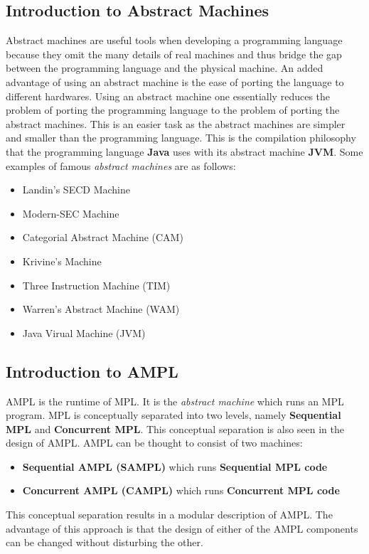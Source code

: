 \documentclass[11pt]{article}
\newcommand{\<}{\langle}
\renewcommand{\>}{\rangle}
\begin{document}
\subsection {Introduction to Abstract Machines}
Abstract machines are useful tools when developing a programming language because they omit the many details of real machines and thus bridge the gap between the programming language and the physical machine. An added advantage of using an abstract machine is the ease of porting the language to different hardwares. Using an abstract machine one essentially reduces the problem of porting the programming language to the problem of porting the abstract machines. This is an easier task as the abstract machines are simpler and smaller than the programming language. This is the compilation philosophy that the programming language {\bf Java} uses with its abstract machine {\bf JVM}. Some examples of famous {\em abstract machines} are as follows:
\begin{itemize} 
  \item Landin's SECD Machine
  \item Modern-SEC Machine
  \item Categorial Abstract Machine (CAM)
  \item Krivine's Machine
  \item Three Instruction Machine (TIM)
  \item Warren's Abstract Machine (WAM)
  \item Java Virual Machine (JVM)
\end {itemize}

\subsection {Introduction to AMPL}
AMPL is the runtime of MPL. It is the {\em abstract machine} which runs an MPL program. MPL is conceptually separated into two levels, namely {\bf Sequential MPL} and {\bf Concurrent MPL}. This conceptual separation is also seen in the design of AMPL. AMPL can be thought to consist of two machines:
\begin{itemize}
  \item {\bf Sequential AMPL (SAMPL)} which runs {\bf Sequential MPL code}
  \item {\bf Concurrent AMPL (CAMPL)} which runs {\bf Concurrent MPL code}
\end {itemize}
This conceptual separation results in a modular description of AMPL. The advantage of this approach is that the design of either of the AMPL components can be changed without disturbing the other.
\end{document}
